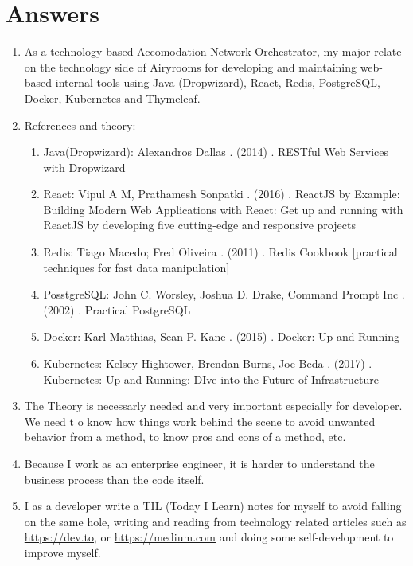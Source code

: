 \documentclass[12pt, letterpaper]{article}
\begin{document}
\section*{Answers}
\begin{enumerate}
    \item As a technology-based Accomodation Network Orchestrator, my major relate on the technology side of Airyrooms for developing and maintaining web-based internal tools using Java (Dropwizard), React, Redis, PostgreSQL, Docker, Kubernetes and Thymeleaf.
    \item References and theory:
        \begin{enumerate}
            \item Java(Dropwizard): Alexandros Dallas . (2014) . RESTful Web Services with Dropwizard
            \item React: Vipul A M, Prathamesh Sonpatki . (2016) . ReactJS by Example: Building Modern Web Applications with React: Get up and running with ReactJS by developing five cutting-edge and responsive projects
            \item Redis: Tiago Macedo; Fred Oliveira . (2011) . Redis Cookbook [practical techniques for fast data manipulation]
            \item PosstgreSQL: John C. Worsley, Joshua D. Drake, Command Prompt Inc . (2002) . Practical PostgreSQL
            \item Docker: Karl Matthias, Sean P. Kane . (2015) . Docker: Up and Running
            \item Kubernetes: Kelsey Hightower, Brendan Burns, Joe Beda . (2017) . Kubernetes: Up and Running: DIve into the Future of Infrastructure
        \end{enumerate}
    \item The Theory is necessarly needed and very important especially for developer. We need t o know how things work behind the scene to avoid unwanted behavior from a method, to know pros and cons of a method, etc.
    \item Because I work as an enterprise engineer, it is harder to understand the business process than the code itself.
    \item I as a developer write a TIL (Today I Learn) notes for myself to avoid falling on the same hole, writing and reading from technology related articles such as \url{https://dev.to}, or \url{https://medium.com} and doing some self-development to improve myself.
\end{enumerate}
\end{document}
